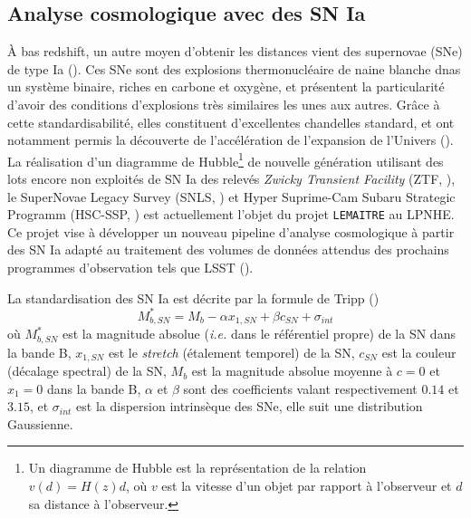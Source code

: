 \documentclass{book}
\begin{document}
\subsection{Analyse cosmologique avec des SN Ia}

À bas redshift, un autre moyen d'obtenir les distances vient des supernovae (SNe) de type Ia (\cite{hoyle_nucleosynthesis_1960}). Ces SNe sont des explosions thermonucléaire de naine blanche dnas un système binaire, riches en carbone et oxygène, et présentent la particularité d’avoir des conditions d'explosions très similaires les unes aux autres. Grâce à cette standardisabilité, elles constituent d'excellentes chandelles standard, et ont notamment permis la découverte de l'accélération de l'expansion de l'Univers (\cite{perlmutter_cosmology_1998, riess_observational_1998}). La réalisation d'un diagramme de Hubble\footnote{Un diagramme de Hubble est la représentation de la relation $v(d)=H(z) d$, où $v$ est la vitesse d'un objet par rapport à l'observeur et $d$ sa distance à l'observeur.} de nouvelle génération utilisant des lots encore non exploités de SN Ia des relevés \textit{Zwicky Transient Facility} (ZTF, \cite{bellm_zwicky_2018}), le SuperNovae Legacy Survey (SNLS, \cite{pritchet_snls_2004}) et Hyper Suprime-Cam Subaru Strategic Programm (HSC-SSP, \cite{miyazaki_hyper_2012,aihara_hyper_2018}) est actuellement l’objet du projet \verb|LEMAITRE| au LPNHE. Ce projet vise à développer un nouveau pipeline d'analyse cosmologique à partir des SN Ia adapté au traitement des volumes de données attendus des prochains programmes d’observation tels que LSST (\cite{the_lsst_dark_energy_science_collaboration_lsst_2021}).

La standardisation des SN Ia est décrite par la formule de Tripp (\cite{tripp_two-parameter_1998})
\begin{equation}
\label{eq:tripp}
    M^*_{b,SN} = M_b - \alpha x_{1,SN} + \beta c_{SN} + \sigma_{int}
\end{equation}
où $M^*_{b,SN}$ est la magnitude absolue (\textit{i.e.} dans le référentiel propre) de la SN dans la bande B, $x_{1,SN}$ est le \textit{stretch} (étalement temporel) de la SN, $c_{SN}$ est la couleur (décalage spectral) de la SN, $M_b$ est la magnitude absolue moyenne à $c=0$ et $x_1=0$ dans la bande B, $\alpha$ et $\beta$ sont des coefficients valant respectivement $0.14$ et $3.15$, et $\sigma_{int}$ est la dispersion intrinsèque des SNe, elle suit une distribution Gaussienne.
\end{document}
